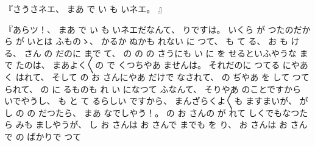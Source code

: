 %
『さうさネエ、
%
まあ
で%
い
も
いネエ。
』

%
『あらツ！、
%
まあ
で%
い
も
いネエだなんて、
%
りですは。
%
いくら
が
つたのだから
が
いとは
ふものゝ、
%
かるか
ぬかも
れない
に
つて、
%
も
て
る、
%
お
も
ける、
%
さん
の
だのに
まで
て、
%
の
の
の
さうにも
い
に%
を
せるといふやうな
まで
たのは、
%
まあよく〳〵の
で
くつちやあ
ませんは。
%
それだのに
つてる
にやあ
く
はれて、
%
そして
の
お
さんにやあ
だけで
なされて、
%
の
ぢやあ
を
して
つて
られて、
%
の
に
るものも
れ
い
になつて
ふなんて、
%
そりやあ
のことですから
いでやうし、
%
も
と
て
るらしい
ですから、
%
まんざらくよ〳〵も
ますまいが、
%
が
し
の
の
だつたら、
%
まあ
なでしやう！。
%
の
お
さんの
が
れて
しくでもなつたら
みも
ましやうが、
%
し
お
さんは
お
さんで
までも
を
り、
%
お
さんは
お
さんで
の
ばかりで
つて
